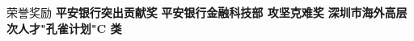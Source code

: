 \begin{rubric}{荣誉奖励}
\entry*[2023] \textbf{平安银行突出贡献奖}
\entry*[2022] \textbf{平安银行金融科技部 攻坚克难奖}
\entry*[2021] \textbf{深圳市海外高层次人才"孔雀计划"C 类}
\end{rubric}
